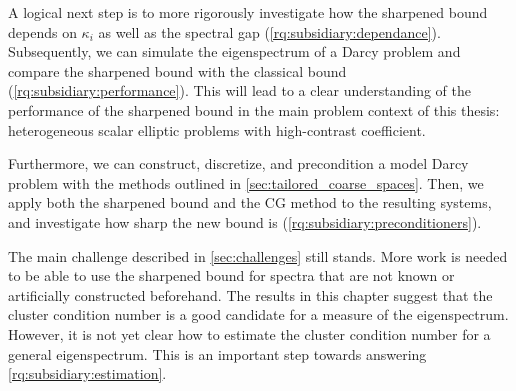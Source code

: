 A logical next step is to more rigorously investigate how the sharpened bound depends on $\kappa_i$ as well as the spectral gap (\ref{rq:subsidiary:dependance}). Subsequently, we can simulate the eigenspectrum of a Darcy problem and compare the sharpened bound with the classical bound (\ref{rq:subsidiary:performance}). This will lead to a clear understanding of the performance of the sharpened bound in the main problem context of this thesis: heterogeneous scalar elliptic problems with high-contrast coefficient.

Furthermore, we can construct, discretize, and precondition a model Darcy problem with the methods outlined in \cref{sec:tailored_coarse_spaces}. Then, we apply both the sharpened bound and the CG method to the resulting systems, and investigate how sharp the new bound is (\ref{rq:subsidiary:preconditioners}).

The main challenge described in \cref{sec:challenges} still stands. More work is needed to be able to use the sharpened bound for spectra that are not known or artificially constructed beforehand. The results in this chapter suggest that the cluster condition number is a good candidate for a measure of the eigenspectrum. However, it is not yet clear how to estimate the cluster condition number for a general eigenspectrum. This is an important step towards answering \ref{rq:subsidiary:estimation}.